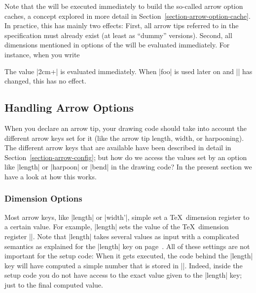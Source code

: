 \begin{command}{\pgfdeclarearrow{}}
\begin{itemize}
            Note that the  will be executed
            immediately to build the so-called arrow option caches, a concept
            explored in more detail in
            Section~\ref{section-arrow-option-cache}. In practice, this has
            mainly two effects: First, all arrow tips referred to in the
            specification must already exist (at least as ``dummy'' versions).
            Second, all dimensions mentioned in options of the  will be evaluated immediately. For instance, when
            you write
\begin{codeexample}
\end{codeexample}
            The value |2cm+\mydimen| is evaluated immediately. When |foo| is
            used later on and |\mydimen| has changed, this has no effect.
    \end{itemize}
\end{command}


\subsection{Handling Arrow Options}
\label{section-arrow-options}

When you declare an arrow tip, your drawing code should take into account the
different arrow keys set for it (like the arrow tip length, width, or
harpooning). The different arrow keys that are available have been described in
detail in Section~\ref{section-arrow-config}; but how do we access the values
set by an option like |length| or |harpoon| or |bend| in the drawing code? In
the present section we have a look at how this works.


\subsubsection{Dimension Options}

Most arrow keys, like |length| or |width'|, simple set a \TeX\ dimension
register to a certain value. For example, |length| sets the value of the \TeX\
dimension register |\pgfarrowlength|. Note that |length| takes several values
as input with a complicated semantics as explained for the |length| key on
page~\pageref{length-arrow-key}. All of these settings are not important for
the setup code: When it gets executed, the code behind the |length| key will
have computed a simple number that is stored in |\pgfarrowlength|. Indeed,
inside the setup code you do not have access to the exact value given to the
|length| key; just to the final computed value.

